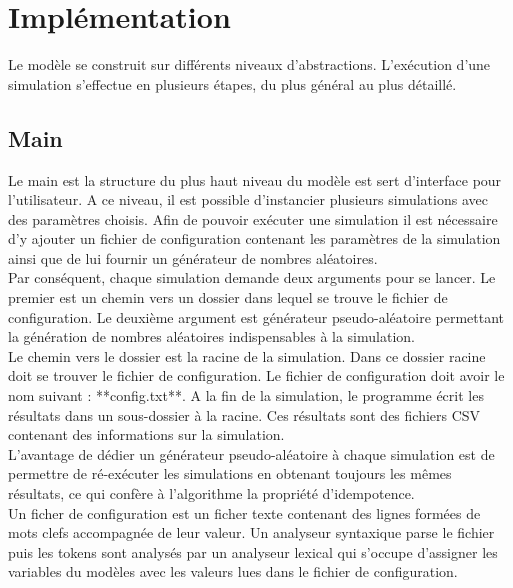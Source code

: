 \chapter{Implémentation} \label{ch:implementation}

Le modèle se construit sur différents niveaux d’abstractions. L'exécution d'une simulation s'effectue en plusieurs étapes, du plus général au plus détaillé.

\section{Main}

Le main est la structure du plus haut niveau du modèle est sert d'interface pour l'utilisateur. A ce niveau, il est possible d'instancier plusieurs simulations avec des paramètres choisis. Afin de pouvoir exécuter une simulation il est nécessaire d'y ajouter un fichier de configuration contenant les paramètres de la simulation ainsi que de lui fournir un générateur de nombres aléatoires.\\

Par conséquent, chaque simulation demande deux arguments pour se lancer. Le premier est un chemin vers un dossier dans lequel se trouve le fichier de configuration. Le deuxième argument est générateur pseudo-aléatoire permettant la génération de nombres aléatoires indispensables à la simulation.\\ 

Le chemin vers le dossier est la racine de la simulation. Dans ce dossier racine doit se trouver le fichier de configuration. Le fichier de configuration doit avoir le nom suivant : **config.txt**.  A la fin de la simulation, le programme écrit les résultats dans un sous-dossier à la racine. Ces résultats sont des fichiers CSV contenant des informations sur la simulation.\\

L'avantage de dédier un générateur pseudo-aléatoire à chaque simulation est de permettre de ré-exécuter les simulations en obtenant toujours les mêmes résultats, ce qui confère à l'algorithme la propriété d'idempotence.\\

Un ficher de configuration est un ficher texte contenant des lignes formées de mots clefs accompagnée de leur valeur. Un analyseur syntaxique parse le fichier puis les tokens sont analysés par un analyseur lexical qui s'occupe d'assigner les variables du modèles avec les valeurs lues dans le fichier de configuration.\\ 

